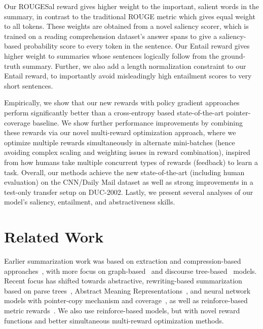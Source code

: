 \documentclass[11pt,a4paper]{article}
\begin{document}
Our ROUGESal reward gives higher weight to the important, salient words in the summary, in contrast to the traditional ROUGE metric which gives equal weight to all tokens. These weights are obtained from a novel saliency scorer, which is trained on a reading comprehension dataset's answer spans  to give a saliency-based probability score to every token in the sentence. Our Entail reward gives higher weight to summaries whose sentences logically follow from the ground-truth summary. Further, we also add a length normalization constraint to our Entail reward, to importantly avoid misleadingly high entailment scores to very short sentences.

Empirically, we show that our new rewards with policy gradient approaches perform significantly better than a cross-entropy based state-of-the-art pointer-coverage baseline. We show further performance improvements by combining these rewards via our novel multi-reward optimization approach, where we optimize multiple rewards simultaneously in alternate mini-batches (hence avoiding complex scaling and weighting issues in reward combination), inspired from how humans take multiple concurrent types of rewards (feedback) to learn a task. Overall, our methods achieve the new state-of-the-art (including human evaluation) on the CNN/Daily Mail dataset as well as strong improvements in a test-only transfer setup on DUC-2002. Lastly, we present several analyses of our model's saliency, entailment, and abstractiveness skills.


 

\section{Related Work}
\label{Related Work}

Earlier summarization work was based on extraction and compression-based approaches~\cite{jing2000sentence,knight2002summarization,clarke2008global,filippova2015sentence}, with more focus on graph-based~\cite{giannakopoulos2009automatic,ganesan2010opinosis} and discourse tree-based~\cite{gerani2014abstractive} models. Recent focus has shifted towards abstractive, rewriting-based summarization based on parse trees~\cite{cheung2014unsupervised,wang2016sentence}, Abstract Meaning Representations~\cite{liu2015toward,dohare2017text}, and neural network models with pointer-copy mechanism and coverage~\cite{rush2015neural,chopra2016abstractive,Chen2016DistractionBasedNN,nallapati2016abstractive,see2017get}, as well as reinforce-based metric rewards~\cite{ranzato2015sequence,paulus2017deep}. 
We also use reinforce-based models, but with novel reward functions and better simultaneous multi-reward optimization methods. 
\end{document}
